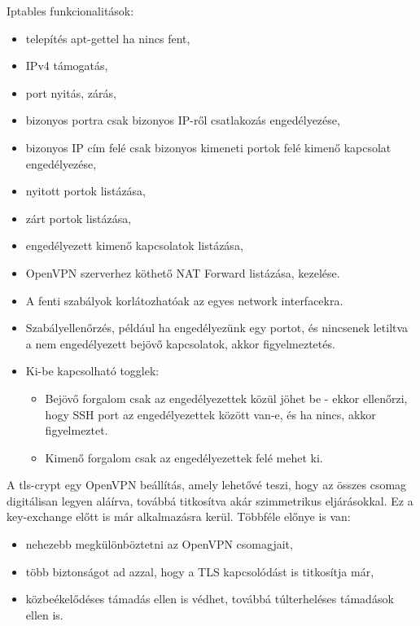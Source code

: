 \pagebreak

Iptables funkcionalitások:
\begin{itemize}
	\item telepítés apt-gettel ha nincs fent,
	\item IPv4 támogatás,
	\item port nyitás, zárás,
	\item bizonyos portra csak bizonyos IP-ről csatlakozás engedélyezése,
	\item bizonyos IP cím felé csak bizonyos kimeneti portok felé kimenő kapcsolat engedélyezése,
	\item nyitott portok listázása,
	\item zárt portok listázása,
	\item engedélyezett kimenő kapcsolatok listázása,
	\item OpenVPN szerverhez köthető NAT Forward listázása, kezelése.
	\item A fenti szabályok korlátozhatóak az egyes network interfacekra.
	\item Szabályellenőrzés, például ha engedélyezünk egy portot, és nincsenek letiltva a nem engedélyezett bejövő kapcsolatok, akkor figyelmeztetés.
	\item Ki-be kapcsolható togglek:
		\begin{itemize}
			\item Bejövő forgalom csak az engedélyezettek közül jöhet be - ekkor ellenőrzi, hogy SSH port az engedélyezettek között van-e, és ha nincs, akkor figyelmeztet.
			\item Kimenő forgalom csak az engedélyezettek felé mehet ki.
		\end{itemize}
\end{itemize}

 \label{ref:tls-crypt}
A tls-crypt egy OpenVPN beállítás, amely lehetővé teszi, hogy az összes csomag digitálisan legyen aláírva, továbbá titkosítva akár szimmetrikus eljárásokkal. Ez a key-exchange előtt is már alkalmazásra kerül. \cite{openvpnmanual}
Többféle előnye is van:
\begin{itemize}
	\item nehezebb megkülönböztetni az OpenVPN csomagjait,
	\item több biztonságot ad azzal, hogy a TLS kapcsolódást is titkosítja már,
	\item közbeékelődéses támadás ellen is védhet, továbbá túlterheléses támadások ellen is.
\end{itemize}

